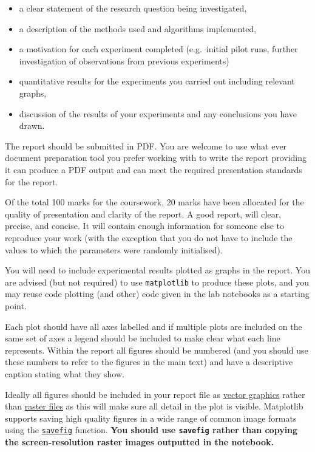 \documentclass[11pt,]{article}
\begin{document}
\begin{itemize}
\itemsep1pt\parskip0pt
\item
  a clear statement of the research question being investigated,
\item
  a description of the methods used and algorithms implemented,
\item
  a motivation for each experiment completed (e.g.~initial pilot runs,
  further investigation of observations from previous experiments)
\item
  quantitative results for the experiments you carried out including
  relevant graphs,
\item
  discussion of the results of your experiments and any conclusions you
  have drawn.
\end{itemize}

The report should be submitted in PDF. You are welcome to use what ever
document preparation tool you prefer working with to write the report
providing it can produce a PDF output and can meet the required
presentation standards for the report.

Of the total 100 marks for the coursework, 20 marks have been allocated
for the quality of presentation and clarity of the report. A good
report, will clear, precise, and concise. It will contain enough
information for someone else to reproduce your work (with the exception
that you do not have to include the values to which the parameters were
randomly initialised).

You will need to include experimental results plotted as graphs in the
report. You are advised (but not required) to use \texttt{matplotlib} to
produce these plots, and you may reuse code plotting (and other) code
given in the lab notebooks as a starting point.

Each plot should have all axes labelled and if multiple plots are
included on the same set of axes a legend should be included to make
clear what each line represents. Within the report all figures should be
numbered (and you should use these numbers to refer to the figures in
the main text) and have a descriptive caption stating what they show.

Ideally all figures should be included in your report file as
\href{https://en.wikipedia.org/wiki/Vector_graphics}{vector graphics}
rather than \href{https://en.wikipedia.org/wiki/Raster_graphics}{raster
files} as this will make sure all detail in the plot is visible.
Matplotlib supports saving high quality figures in a wide range of
common image formats using the
\href{http://matplotlib.org/api/pyplot_api.html\#matplotlib.pyplot.savefig}{\texttt{savefig}}
function. \textbf{You should use \texttt{savefig} rather than copying
the screen-resolution raster images outputted in the notebook.}
\end{document}
